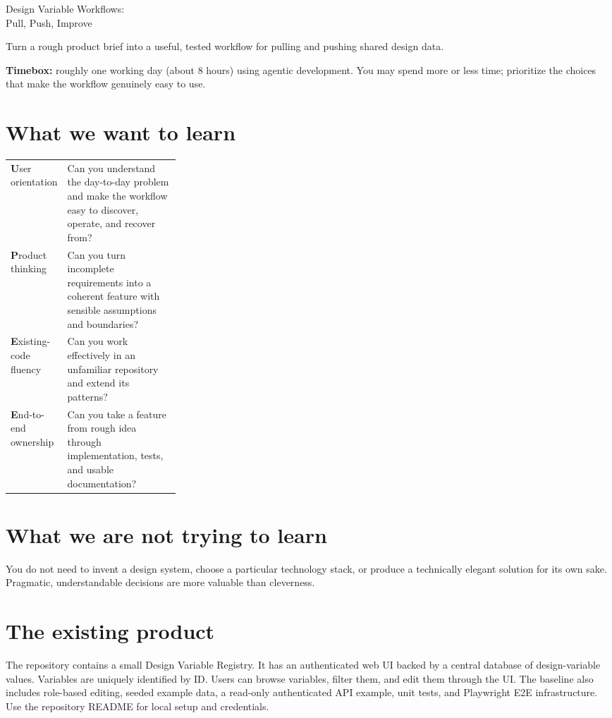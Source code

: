 \documentclass[10pt,a4paper]{article}
\newcommand{\labeltext}[1]{\textcolor{accent}{\textbf{#1}}}
\newcommand{\callout}[1]{\noindent\colorbox{accentlight}{\parbox{\dimexpr\linewidth-2\fboxsep\relax}{\textcolor{ink}{#1}}}}
\begin{document}
\color{ink}

\vspace*{0.25cm}

{\fontsize{21}{24}\selectfont\bfseries
  \parbox{\linewidth}{Design Variable Workflows:\\Pull, Push, Improve}\par}
\vspace{3pt}
{\large\color{muted}Turn a rough product brief into a useful, tested workflow for pulling and pushing shared design data.\par}

\callout{\labeltext{Timebox:} roughly one working day (about 8 hours) using agentic development. You may spend more or less time; prioritize the choices that make the workflow genuinely easy to use.}

\section{What we want to learn}
\begin{tabularx}{\linewidth}{@{}>{\labeltext}p{0.28\linewidth}X@{}}
User orientation & Can you understand the day-to-day problem and make the workflow easy to discover, operate, and recover from?\\
Product thinking & Can you turn incomplete requirements into a coherent feature with sensible assumptions and boundaries?\\
Existing-code fluency & Can you work effectively in an unfamiliar repository and extend its patterns?\\
End-to-end ownership & Can you take a feature from rough idea through implementation, tests, and usable documentation?
\end{tabularx}

\section{What we are not trying to learn}
You do not need to invent a design system, choose a particular technology stack, or produce a technically elegant solution for its own sake. Pragmatic, understandable decisions are more valuable than cleverness.

\section{The existing product}
The repository contains a small Design Variable Registry. It has an authenticated web UI backed by a central database of design-variable values. Variables are uniquely identified by ID. Users can browse variables, filter them, and edit them through the UI. The baseline also includes role-based editing, seeded example data, a read-only authenticated API example, unit tests, and Playwright E2E infrastructure. Use the repository README for local setup and credentials.
\end{document}
